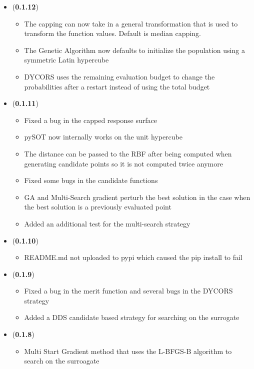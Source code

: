 \documentclass[]{article}
\begin{document}
\begin{itemize}
	\item (\textbf{0.1.12}) 
	\begin{itemize}
		\item The capping can now take in a general transformation that is used to transform the function 
		values. Default is median capping.
		\item The Genetic Algorithm now defaults to initialize the population using a symmetric Latin hypercube
		\item DYCORS uses the remaining evaluation budget to change the probabilities after a restart instead 
		of using the total budget 
	\end{itemize}

	\item (\textbf{0.1.11}) 
	\begin{itemize}
		\item Fixed a bug in the capped response surface
		\item pySOT now internally works on the unit hypercube
		\item The distance can be passed to the RBF after being computed when generating candidate points 
		so it is not computed twice anymore
		\item Fixed some bugs in the candidate functions
		\item GA and Multi-Search gradient perturb the best solution in the case when the best solution is a 
		previously evaluated point
		\item Added an additional test for the multi-search strategy
	\end{itemize}

	\item (\textbf{0.1.10}) 
	\begin{itemize}
		\item README.md not uploaded to pypi which caused the pip install to fail
	\end{itemize}

	\item (\textbf{0.1.9}) 
	\begin{itemize}
		\item Fixed a bug in the merit function and several bugs in the DYCORS strategy
		\item Added a DDS candidate based strategy for searching on the surrogate
	\end{itemize}

	\item (\textbf{0.1.8}) 
	\begin{itemize}
		\item Multi Start Gradient method that uses the L-BFGS-B algorithm to search on the surroagate
	\end{itemize}


\end{itemize}
\end{document}
